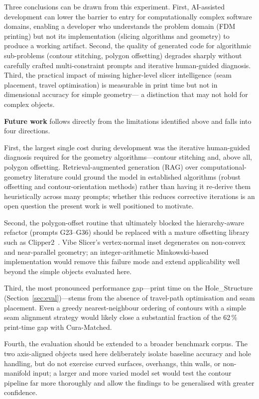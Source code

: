 \documentclass[10pt,twocolumn,a4paper]{article}
\begin{document}
Three conclusions can be drawn from this experiment.
First, AI-assisted development can lower the barrier to entry
for computationally complex software domains, enabling a developer
who understands the problem domain (FDM printing) but not its
implementation (slicing algorithms and geometry) to produce a
working artifact.
Second, the quality of generated code for algorithmic sub-problems
(contour stitching, polygon offsetting) degrades sharply without
carefully crafted multi-constraint prompts and iterative
human-guided diagnosis.
Third, the practical impact of missing higher-level slicer
intelligence (seam placement, travel optimisation) is measurable
in print time but not in dimensional accuracy for simple geometry—
a distinction that may not hold for complex objects.

\textbf{Future work} follows directly from the limitations
identified above and falls into four directions.

First, the largest single cost during development was the
iterative human-guided diagnosis required for the geometry
algorithms—contour stitching and, above all, polygon offsetting.
Retrieval-augmented generation (RAG) over computational-geometry
literature could ground the model in established algorithms
(robust offsetting and contour-orientation methods) rather than
having it re-derive them heuristically across many prompts;
whether this reduces corrective iterations is an open question
the present work is well positioned to motivate.

Second, the polygon-offset routine that ultimately blocked the
hierarchy-aware refactor (prompts G23--G36) should be replaced
with a mature offsetting library such as Clipper2~\cite{clipper2}.
Vibe Slicer's vertex-normal inset degenerates on non-convex and
near-parallel geometry; an integer-arithmetic Minkowski-based
implementation would remove this failure mode and extend
applicability well beyond the simple objects evaluated here.

Third, the most pronounced performance gap—print time on the
Hole\_Structure (Section~\ref{sec:eval})—stems from the absence of
travel-path optimisation and seam placement. Even a greedy
nearest-neighbour ordering of contours with a simple seam
alignment strategy would likely close a substantial fraction of
the 62\,\% print-time gap with Cura-Matched.

Fourth, the evaluation should be extended to a broader benchmark
corpus. The two axis-aligned objects used here deliberately
isolate baseline accuracy and hole handling, but do not exercise
curved surfaces, overhangs, thin walls, or non-manifold input;
a larger and more varied model set would test the contour
pipeline far more thoroughly and allow the findings to be
generalised with greater confidence.
\end{document}
